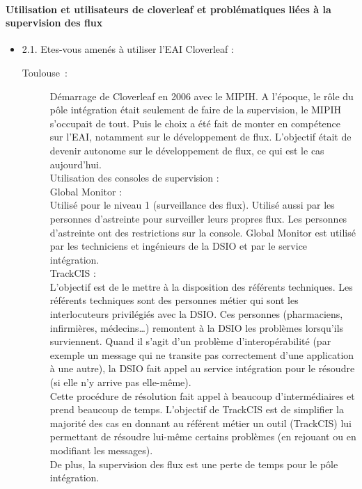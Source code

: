 	\paragraph{Utilisation et utilisateurs de cloverleaf et problématiques liées à
	la supervision des flux}
	\begin{itemize}
	  \item 2.1. Etes-vous amenés à utiliser l’EAI Cloverleaf :
  	  \begin{description}
	  	\item[Toulouse~:] Démarrage de Cloverleaf en 2006 avec le MIPIH. A l’époque,
	  	le rôle du pôle intégration était seulement de faire de la supervision, le
	  	MIPIH s’occupait de tout. Puis le choix a été fait de monter en compétence
	  	sur l’EAI, notamment sur le développement de flux. L’objectif était de
	  	devenir autonome sur le développement de flux, ce qui est le cas
	  	aujourd’hui.\\
	  	Utilisation des consoles de supervision :\\
	  	Global Monitor :\\
	  	Utilisé pour le niveau 1 (surveillance des flux). Utilisé aussi par les
	  	personnes d’astreinte pour surveiller leurs propres flux. Les personnes
	  	d’astreinte ont des restrictions sur la console.
		Global Monitor est utilisé par les techniciens et ingénieurs de la DSIO et par
		le service intégration.\\
	  	TrackCIS :\\
	  	L’objectif est de le mettre à la disposition des référents techniques.
		Les référents techniques sont des personnes métier qui sont les interlocuteurs
		privilégiés avec la DSIO. Ces personnes (pharmaciens, infirmières, médecins…)
		remontent à la DSIO les problèmes lorsqu'ils surviennent. Quand il s’agit
		d’un problème d’interopérabilité (par exemple un message qui ne transite pas
		correctement d’une application à une autre), la DSIO fait appel au service
		intégration pour le résoudre (si elle n’y arrive pas elle-même).\\
	  	Cette procédure de résolution fait appel à beaucoup d’intermédiaires et
	  	prend beaucoup de temps. L’objectif de TrackCIS est de simplifier la
	  	majorité des cas en donnant au référent métier un outil (TrackCIS) lui
	  	permettant de résoudre lui-même certains problèmes (en rejouant ou en
	  	modifiant les messages).\\
		De plus, la supervision des flux est une perte de temps pour le pôle
		intégration.\\

\end{description}
\end{itemize}
